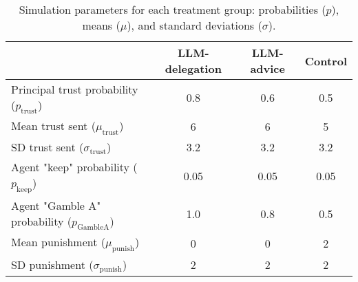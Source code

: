 \documentclass[
]{article}
\begin{document}
\begin{table}[ht]
\centering
\begin{tabular}{lccc}
\toprule
 & \textbf{LLM-delegation} & \textbf{LLM-advice} & \textbf{Control} \\
\midrule
Principal trust probability ($p_\text{trust}$) & 0.8 & 0.6 & 0.5 \\
Mean trust sent ($\mu_\text{trust}$) & 6 & 6 & 5 \\
SD trust sent ($\sigma_\text{trust}$) & 3.2 & 3.2 & 3.2 \\
Agent "keep" probability ($p_\text{keep}$) & 0.05 & 0.05 & 0.05 \\
Agent "Gamble A" probability ($p_\text{GambleA}$) & 1.0 & 0.8 & 0.5 \\
Mean punishment ($\mu_\text{punish}$) & 0 & 0 & 2 \\
SD punishment ($\sigma_\text{punish}$) & 2 & 2 & 2 \\
\bottomrule
\end{tabular}
\caption{Simulation parameters for each treatment group: probabilities ($p$), means ($\mu$), and standard deviations ($\sigma$).}
\end{table}
\end{document}
